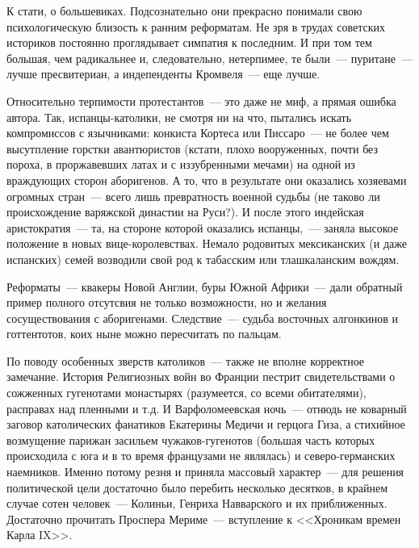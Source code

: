 К стати, о большевиках. Подсознательно они прекрасно понимали свою психологическую близость к ранним реформатам. Не зря в трудах советских историков постоянно проглядывает симпатия к последним. И при том тем большая, чем радикальнее и, следовательно, нетерпимее, те были~--- пуритане~--- лучше пресвитериан, а индепенденты Кромвеля~--- еще лучше. 

Относительно терпимости протестантов~--- это даже не миф, а прямая ошибка автора. Так, испанцы-католики, не смотря ни на что, пытались искать компромиссов с язычниками: конкиста Кортеса или Писсаро~--- не более чем высутпление горстки авантюристов (кстати, плохо вооруженных, почти без пороха, в проржавевших латах и с иззубренными мечами) на одной из враждующих сторон аборигенов. А то, что в результате они оказались хозяевами огромных стран~--- всего лишь превратность военной судьбы (не таково ли происхождение варяжской династии на Руси?). И после этого индейская аристократия~--- та, на стороне которой оказались испанцы,~--- заняла высокое положение в новых вице-королевствах. Немало родовитых мексиканских (и даже испанских) семей возводили свой род к табасским или тлашкаланским вождям. 

Реформаты~--- квакеры Новой Англии, буры Южной Африки~--- дали обратный пример полного отсутсвия не только возможности, но и желания сосуществования с аборигенами. Следствие~--- судьба восточных алгонкинов и готтентотов, коих ныне можно пересчитать по пальцам. 

По поводу особенных зверств католиков~--- также не вполне корректное замечание. История Религиозных войн во Франции пестрит свидетельствами о сожженных гугенотами монастырях (разумеется, со всеми обитателями), расправах над пленными и т.д. И Варфоломеевская ночь~--- отнюдь не коварный заговор католических фанатиков Екатерины Медичи и герцога Гиза, а стихийное возмущение парижан засильем чужаков-гугенотов (большая часть которых происходила с юга и в то время французами не являлась) и северо-германских наемников. Именно потому резня и приняла массовый характер~--- для решения политической цели достаточно было перебить несколько десятков, в крайнем случае сотен человек~--- Колиньи, Генриха Навварского и их приближенных. Достаточно прочитать Проспера Мериме~--- вступление к <<Хроникам времен Карла IX>>. 

